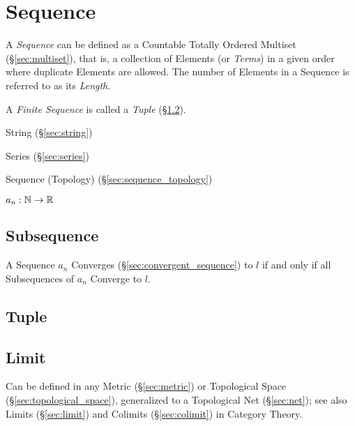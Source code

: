 \section{Sequence}\label{sec:sequence}

A \emph{Sequence} can be defined as a Countable Totally Ordered
Multiset (\S\ref{sec:multiset}), that is, a collection of Elements (or
\emph{Terms}) in a given order where duplicate Elements are allowed.
The number of Elements in a Sequence is referred to as its
\emph{Length}.

A \emph{Finite Sequence} is called a \emph{Tuple} (\S\ref{sec:tuple}).

String (\S\ref{sec:string})

Series (\S\ref{sec:series})

Sequence (Topology) (\S\ref{sec:sequence_topology})

$a_n : \mathbb{N} \rightarrow \mathbb{R}$



\subsection{Subsequence}\label{sec:subsequence}

A Sequence $a_n$ Converges (\S\ref{sec:convergent_sequence}) to $l$
if and only if all Subsequences of $a_n$ Converge to $l$.



\subsection{Tuple}\label{sec:tuple}

\subsection{Limit}\label{sec:sequence_limit}

Can be defined in any Metric (\S\ref{sec:metric}) or Topological Space
(\S\ref{sec:topological_space}), generalized to a Topological Net
(\S\ref{sec:net}); see also Limits (\S\ref{sec:limit}) and Colimits
(\S\ref{sec:colimit}) in Category Theory.

